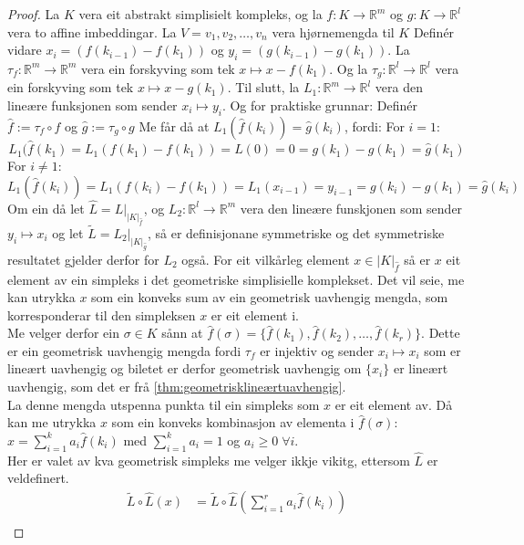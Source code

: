 \documentclass[a4paper, titlepage, 12pt, norsk]{article}
\theoremstyle{plain}
\theoremstyle{definition}
\newcommand{\Rb}{\mathbb{R}}
\begin{document}
\begin{proof}%
	La $K$ vera eit abstrakt simplisielt kompleks, og la $f:K\to\Rb^m$ og $g:K\to\Rb^l$ vera to affine imbeddingar. La $V={v_1, v_2, \dots, v_n}$ vera hjørnemengda til $K$ Definér vidare $x_i=(f(k_{i-1})-f(k_1))$ og $y_i=(g(k_{i-1})-g(k_1))$. La $\tau_f:\Rb^m\to\Rb^m$ vera ein forskyving som tek $x\mapsto x-f(k_1)$. Og la $\tau_g:\Rb^l\to\Rb^l$ vera ein forskyving som tek $x\mapsto x-g(k_1)$. Til slutt, la $L_1:\Rb^m\to\Rb^l$ vera den lineære funksjonen som sender $x_i\mapsto y_i$.
Og for praktiske grunnar: Definér $\hat{f}:=\tau_f\circ f$ og $\hat{g}:=\tau_g \circ g$
Me får då at $L_1(\hat{f}(k_i))=\hat{g}(k_i)$, fordi:
For $i=1$:
\begin{equation*}
	L_1(\hat{f}(k_1)=L_1(f(k_1)-f(k_1))=L(0)=0=g(k_1)-g(k_1)=\hat{g}(k_1)
\end{equation*}
For $i\neq 1$:
\begin{equation*}
	L_1(\hat{f}(k_i))=L_1(f(k_i)-f(k_1))=L_1(x_{i-1})=y_{i-1}=g(k_i)-g(k_1)=\hat{g}(k_i)
\end{equation*}
Om ein då let $\hat{L}=L|_{|K|_{\hat{f}}}$, og $L_2:\Rb^l\to\Rb^m$ vera den lineære funskjonen som sender $y_i\mapsto x_i$ og let $\tilde{L}=L_2|_{|K|_{\hat{g}}}$, så er definisjonane symmetriske og det symmetriske resultatet gjelder derfor for $L_2$ også. 
For eit vilkårleg element $x\in|K|_{\hat{f}}$ så er $x$ eit element av ein simpleks i det geometriske simplisielle komplekset. Det vil seie, me kan utrykka $x$ som ein konveks sum av ein geometrisk uavhengig mengda, som korresponderar til den simpleksen $x$ er eit element i.
\\Me velger derfor ein $\sigma\in K$ sånn at $\hat{f}(\sigma)=\{\hat{f}(k_1), \hat{f}(k_2), \dots, \hat{f}(k_r)\}$. Dette er ein geometrisk uavhengig mengda fordi $\tau_f$ er injektiv og sender $x_i\mapsto x_i$ som er lineært uavhengig og biletet er derfor geometrisk uavhengig om $\{x_i\}$ er lineært uavhengig, som det er frå \autoref{thm:geometrisklineærtuavhengig}.
\\La denne mengda utspenna punkta til ein simpleks som $x$ er eit element av. Då kan me utrykka $x$ som ein konveks kombinasjon av elementa i $\hat{f}(\sigma)$: $x=\sum_{i=1}^ka_i\hat{f}(k_i)$ med $\sum_{i=1}^ka_i=1$ og $a_i\geq0\; \forall i$. 
\\Her er valet av kva geometrisk simpleks me velger ikkje vikitg, ettersom $\hat{L}$ er veldefinert.
\begin{align*}
	\tilde{L}\circ \hat{L}(x) &= \tilde{L}\circ \hat{L}\left(\sum_{i=1}^ra_i\hat{f}(k_i)\right) \\

\end{align*}
\end{proof}
\end{document}
